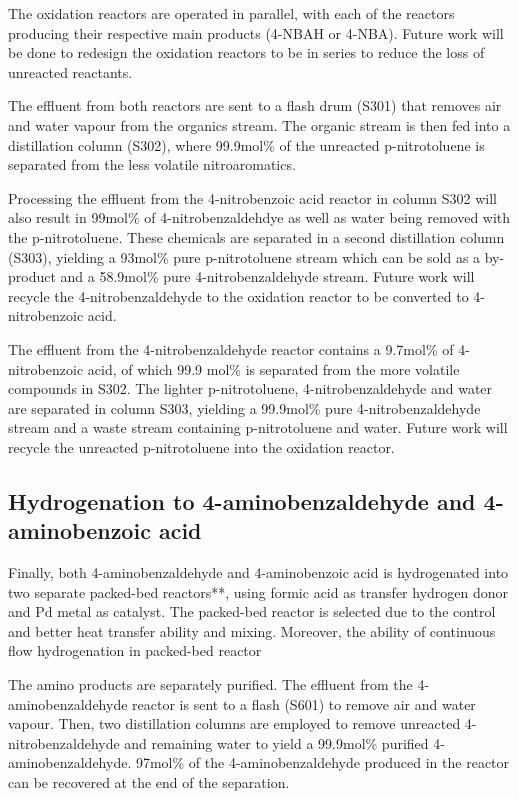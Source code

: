 The oxidation reactors are operated in parallel, with each of the reactors producing their respective main products (4-NBAH or 4-NBA). Future work will be done to redesign the oxidation reactors to be in series to reduce the loss of unreacted reactants.

The effluent from both reactors are sent to a flash drum (S301) that removes air and water vapour from the organics stream. The organic stream is then fed into a distillation column (S302), where 99.9mol\% of the unreacted p-nitrotoluene is separated from the less volatile nitroaromatics. 

Processing the effluent from the 4-nitrobenzoic acid reactor in column S302 will also result in 99mol\% of 4-nitrobenzaldehdye as well as water being removed with the p-nitrotoluene. These chemicals are separated in a second distillation column (S303), yielding a 93mol\% pure p-nitrotoluene stream which can be sold as a by-product and a 58.9mol\% pure 4-nitrobenzaldehyde stream. Future work will recycle the 4-nitrobenzaldehyde to the oxidation reactor to be converted to 4-nitrobenzoic acid.

The effluent from the 4-nitrobenzaldehyde reactor contains a 9.7mol\% of 4-nitrobenzoic acid, of which 99.9 mol\% is separated from the more volatile compounds in S302. The lighter p-nitrotoluene,  4-nitrobenzaldehyde and water are separated in column S303, yielding a 99.9mol\% pure 4-nitrobenzaldehyde stream and a waste stream containing p-nitrotoluene and water. Future work will recycle the unreacted p-nitrotoluene into the oxidation reactor.

\subsection{Hydrogenation to 4-aminobenzaldehyde and 4-aminobenzoic acid}

Finally, both 4-aminobenzaldehyde and 4-aminobenzoic acid is hydrogenated into two separate packed-bed reactors**, using formic acid as transfer hydrogen donor and Pd metal as catalyst. The packed-bed reactor is selected due to the control and better heat transfer ability and mixing. Moreover, the ability of continuous flow hydrogenation in packed-bed reactor 

The amino products are separately purified. The effluent from the 4-aminobenzaldehyde reactor is sent to a flash (S601) to remove air and water vapour.  Then, two distillation columns are employed to remove unreacted 4-nitrobenzaldehyde and remaining water to yield a 99.9mol\% purified 4-aminobenzaldehyde. 97mol\% of the 4-aminobenzaldehyde produced in the reactor can be recovered at the end of the separation.

